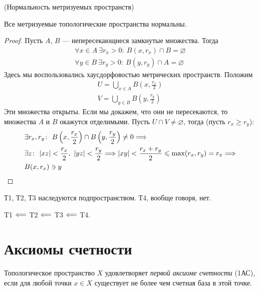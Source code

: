 \begin{theorem}(Нормальность метризуемых пространств)

	Все метризуемые топологические пространства нормальны.
\end{theorem}
\begin{proof}
	Пусть $A$, $B$ --- непересекающиеся замкнутые множества. Тогда
	\begin{align*}
		\forall x \in A~ \exists r_x > 0\colon~ B(x, r_x) \cap B = \varnothing \\
		\forall y \in B~ \exists r_y > 0\colon~ B(y, r_y) \cap A = \varnothing
	\end{align*}
	Здесь мы воспользовались хаусдорфовостью метрических пространств.
	Положим
	\begin{align*}
		U = \bigcup_{x \in A}{B\left(x, \frac{r_x}{2}\right)} \\
		V = \bigcup_{y \in B}{B\left(y, \frac{r_y}{2}\right)}
	\end{align*}
	Эти множества открыты. Если мы докажем, что они не пересекаются,
	то множества $A$ и $B$ окажутся отделимыми.
	Пусть $U \cap V \neq \varnothing$, тогда (пусть $r_x \geqslant r_y$):
\begin{align*}
	&\exists r_x, r_y\colon~ B\left(x, \frac{r_x}{2}\right)
		\cap B\left(y, \frac{r_y}{2}\right) \neq 0 \Longrightarrow \\
	&\exists z\colon~ |xz| < \frac{r_x}{2},~ |yz| < \frac{r_y}{2} \Longrightarrow
	|xy| < \frac{r_x + r_y}{2} \leqslant \max(r_x, r_y) = r_x
	\Longrightarrow \\ &B(x, r_x) \ni y
\end{align*}
\end{proof}

\begin{remark}
	Т1, Т2, Т3 наследуются подпространством. Т4, вообще говоря, нет.
\end{remark}

\begin{remark}
	T1 $\Longleftarrow$ T2 $\Longleftarrow$ T3 $\Longleftarrow$ T4.
\end{remark}

\section{Аксиомы счетности}

\begin{definition}
	Топологическое пространство $X$ удовлетворяет \textit{первой аксиоме счетности} (1АС),
	если для любой точки $x \in X$ существует не более чем счетная база в этой точке.
\end{definition}


